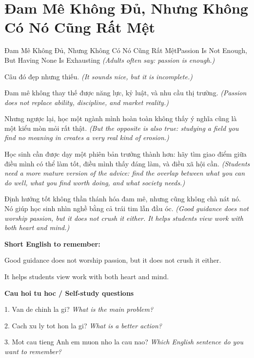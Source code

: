 \section{Đam Mê Không Đủ, Nhưng Không Có Nó Cũng Rất Mệt}
\begin{truyen}{Đam Mê Không Đủ, Nhưng Không Có Nó Cũng Rất Mệt}{Passion Is Not Enough, But Having None Is Exhausting}
\textit{(Adults often say: passion is enough.)}

Câu đó đẹp nhưng thiếu.
\textit{(It sounds nice, but it is incomplete.)}

Đam mê không thay thế được năng lực, kỷ luật, và nhu cầu thị trường.
\textit{(Passion does not replace ability, discipline, and market reality.)}

Nhưng ngược lại, học một ngành mình hoàn toàn không thấy ý nghĩa cũng là một kiểu mòn mỏi rất thật.
\textit{(But the opposite is also true: studying a field you find no meaning in creates a very real kind of erosion.)}

Học sinh cần được dạy một phiên bản trưởng thành hơn: hãy tìm giao điểm giữa điều mình có thể làm tốt, điều mình thấy đáng làm, và điều xã hội cần.
\textit{(Students need a more mature version of the advice: find the overlap between what you can do well, what you find worth doing, and what society needs.)}

\end{truyen}

\begin{baihoc}
Định hướng tốt không thần thánh hóa đam mê, nhưng cũng không chà nát nó. Nó giúp học sinh nhìn nghề bằng cả trái tim lẫn đầu óc.
\textit{(Good guidance does not worship passion, but it does not crush it either. It helps students view work with both heart and mind.)}
\end{baihoc}

\begin{ghinhoanh}
\textbf{Short English to remember:}

Good guidance does not worship passion, but it does not crush it either.

It helps students view work with both heart and mind.

\end{ghinhoanh}

\begin{tuhocnhanh}
\textbf{Cau hoi tu hoc / Self-study questions}

1. Van de chinh la gi? \textit{What is the main problem?}

2. Cach xu ly tot hon la gi? \textit{What is a better action?}

3. Mot cau tieng Anh em muon nho la cau nao? \textit{Which English sentence do you want to remember?}
\end{tuhocnhanh}
\ngancach

